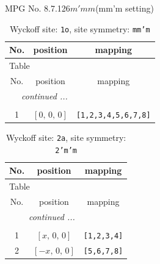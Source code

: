 \documentclass[fleqn,8pt]{jsarticle}
\begin{document}
\setcounter{MaxMatrixCols}{32}

\renewcommand{\tablename}{Table~}
\renewcommand{\figurename}{Figure~}
\begin{center}
\LARGE
MPG No. 8.7.126\quad$m'mm$\quad(mm'm setting)
\end{center}
\renewcommand{\arraystretch}{1.2}
\begin{longtable}{ccc}
\caption{Wyckoff site: {\tt 1o}, site symmetry: {\tt mm'm}}
 \\
 \hline \hline
No. & position & mapping \\ \hline \endfirsthead

\multicolumn{2}{l}{\tablename\ \thetable{}} \\
 \hline \hline
No. & position & mapping \\ \hline \endhead

 \hline \hline
\multicolumn{2}{r}{\footnotesize\it continued ...} \\ \endfoot

 \hline \hline
\multicolumn{2}{r}{} \\ \endlastfoot

1 & $\left[ 0,\, 0,\, 0 \right]$ & {\tt [1,2,3,4,5,6,7,8]} \\
\end{longtable}
\renewcommand{\arraystretch}{1.2}
\begin{longtable}{ccc}
\caption{Wyckoff site: {\tt 2a}, site symmetry: {\tt 2'm'm}}
 \\
 \hline \hline
No. & position & mapping \\ \hline \endfirsthead

\multicolumn{2}{l}{\tablename\ \thetable{}} \\
 \hline \hline
No. & position & mapping \\ \hline \endhead

 \hline \hline
\multicolumn{2}{r}{\footnotesize\it continued ...} \\ \endfoot

 \hline \hline
\multicolumn{2}{r}{} \\ \endlastfoot

1 & $\left[ x,\, 0,\, 0 \right]$ & {\tt [1,2,3,4]} \\ \hline
2 & $\left[ - x,\, 0,\, 0 \right]$ & {\tt [5,6,7,8]} \\
\end{longtable}
\renewcommand{\arraystretch}{1.2}
\end{document}
